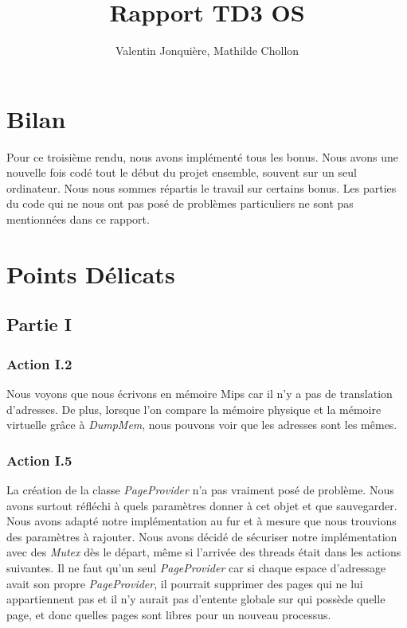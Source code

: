 \documentclass{article}
\author{
    Valentin Jonquière,
    Mathilde Chollon
}
\title{Rapport TD3 OS}
\begin{document}
\maketitle

\pagebreak

\tableofcontents

\pagebreak

\section{Bilan}

Pour ce troisième rendu, nous avons implémenté tous les bonus. Nous avons une nouvelle fois codé tout le début du projet ensemble,
souvent sur un seul ordinateur. Nous nous sommes répartis le travail sur certains bonus.
Les parties du code qui ne nous ont pas posé de problèmes particuliers ne sont pas mentionnées dans ce rapport.

\section{Points Délicats}
\subsection{Partie I}
\subsubsection{Action I.2}
Nous voyons que nous écrivons en mémoire Mips car il n'y a pas de translation d'adresses. De plus, lorsque 
l'on compare la mémoire physique et la mémoire virtuelle grâce à \textit{DumpMem}, nous pouvons voir que les adresses sont les mêmes.

\subsubsection{Action I.5}
La création de la classe \textit{PageProvider} n'a pas vraiment posé de problème. Nous avons
surtout réfléchi à quels paramètres donner à cet objet et que sauvegarder. Nous avons 
adapté notre implémentation au fur et à mesure que nous trouvions des paramètres à rajouter.
Nous avons décidé de sécuriser notre implémentation avec des \textit{Mutex} dès le départ,
même si l'arrivée des threads était dans les actions suivantes. Il ne faut qu'un seul \textit{PageProvider}
car si chaque espace d'adressage avait son propre \textit{PageProvider}, il pourrait supprimer des
pages qui ne lui appartiennent pas et il n'y aurait pas d'entente globale sur qui possède quelle page,
et donc quelles pages sont libres pour un nouveau processus.
\end{document}
